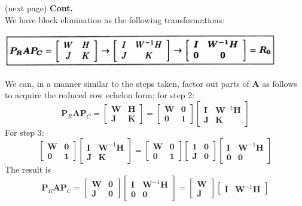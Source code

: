 \documentclass{report}
\begin{document}
(next page)\newpage
\noindent\textbf{Cont.}\\
We have block elimination as the following transformations:
\begin{center}
\includegraphics[width=12cm]{47}
\end{center}
We can, in a manner similar to the steps taken, factor out parts of $\bm A$ as follows to acquire the reduced row echelon form; for step 2:
\begin{equation*}
\bm P_R\bm A\bm P_C=\left[\begin{array}{cc}
\bm W&\bm H\\
\bm J&\bm K\end{array}\right]=
\left[\begin{array}{cc}
\bm W&\bm 0\\
\bm 0&\bm 1\end{array}\right]
\left[\begin{array}{cc}
\bm I&\bm W^{-1}\bm H\\
\bm J&\bm K\end{array}\right]
\end{equation*}
For step 3:
\begin{equation*}
\left[\begin{array}{cc}
\bm W&\bm 0\\
\bm 0&\bm 1\end{array}\right]
\left[\begin{array}{cc}
\bm I&\bm W^{-1}\bm H\\
\bm J&\bm K\end{array}\right]=
\left[\begin{array}{cc}
\bm W&\bm 0\\
\bm 0&\bm 1\end{array}\right]
\left[\begin{array}{cc}
\bm 1&\bm 0\\
\bm J&\bm 0\end{array}\right]
\left[\begin{array}{cc}
\bm I&\bm W^{-1}\bm H\\
\bm 0&\bm 0\end{array}\right]
\end{equation*}
The result is
\begin{equation*}
\bm P_R\bm A\bm P_C=
\left[\begin{array}{cc}
\bm W&\bm 0\\
\bm J&\bm 0\end{array}\right]
\left[\begin{array}{cc}
\bm I&\bm W^{-1}\bm H\\
\bm 0&\bm 0\end{array}\right]=\left[\begin{array}{c}
\bm W\\
\bm J\end{array}\right]
\left[\begin{array}{cc}
\bm I&\bm W^{-1}\bm H\end{array}\right]
\end{equation*}
\end{document}
